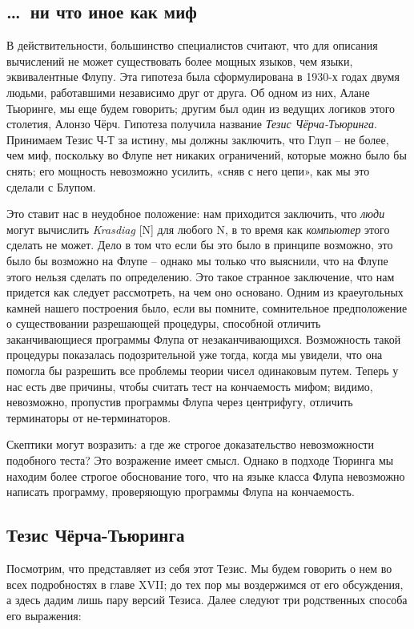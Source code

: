 \documentclass[../main.tex]{subfiles}
\begin{document}
\subsection{\ldots~ни что иное как миф}

В действительности, большинство специалистов считают, что для описания вычислений не может существовать более мощных языков, чем языки, эквивалентные Флупу. Эта гипотеза была сформулирована в 1930-х годах двумя людьми, работавшими независимо друг от друга. Об одном из них, Алане Тьюринге, мы еще будем говорить; другим был один из ведущих логиков этого столетия, Алонзо Чёрч. Гипотеза получила название \emph{Тезис Чёрча-Тьюринга}. Принимаем Тезис Ч-Т за истину, мы должны заключить, что Глуп \--- не более, чем миф, поскольку во Флупе нет никаких ограничений, которые можно было бы снять; его мощность невозможно усилить, «сняв с него цепи», как мы это сделали с Блупом.

Это ставит нас в неудобное положение: нам приходится заключить, что \emph{люди} могут вычислить \emph{Krasdiag} {[}N{]} для любого N, в то время как \emph{компьютер} этого сделать не может. Дело в том что если бы это было в принципе возможно, это было бы возможно на Флупе \--- однако мы только что выяснили, что на Флупе этого нельзя сделать по определению. Это такое странное заключение, что нам придется как следует рассмотреть, на чем оно основано. Одним из краеугольных камней нашего построения было, если вы помните, сомнительное предположение о существовании разрешающей процедуры, способной отличить заканчивающиеся программы Флупа от незаканчивающихся. Возможность такой процедуры показалась подозрительной уже тогда, когда мы увидели, что она помогла бы разрешить все проблемы теории чисел одинаковым путем. Теперь у нас есть две причины, чтобы считать тест на кончаемость мифом; видимо, невозможно, пропустив программы Флупа через центрифугу, отличить терминаторы от не-терминаторов.

Скептики могут возразить: а где же строгое доказательство невозможности подобного теста? Это возражение имеет смысл. Однако в подходе Тюринга мы находим более строгое обоснование того, что на языке класса Флупа невозможно написать программу, проверяющую программы Флупа на кончаемость.


\subsection{Тезис Чёрча-Тьюринга}

Посмотрим, что представляет из себя этот Тезис. Мы будем говорить о нем во всех подробностях в главе XVII; до тех пор мы воздержимся от его обсуждения, а здесь дадим лишь пару версий Тезиса. Далее следуют три родственных способа его выражения:
\end{document}
